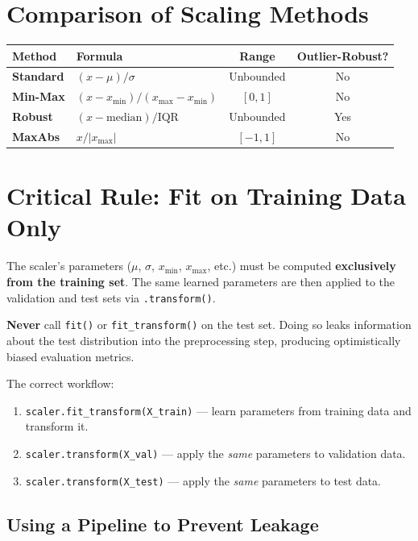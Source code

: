 \section*{Comparison of Scaling Methods}

\begin{center}
\begin{tabularx}{\textwidth}{>{\bfseries}l X c c}
\toprule
Method & Formula & Range & Outlier-Robust? \\
\midrule
Standard & $(x - \mu) / \sigma$ & Unbounded & No \\
Min-Max & $(x - x_{\min}) / (x_{\max} - x_{\min})$ & $[0,1]$ & No \\
Robust & $(x - \text{median}) / \text{IQR}$ & Unbounded & Yes \\
MaxAbs & $x / |x_{\max}|$ & $[-1,1]$ & No \\
\bottomrule
\end{tabularx}
\end{center}

\section*{Critical Rule: Fit on Training Data Only}

\begin{remark}
The scaler's parameters ($\mu$, $\sigma$, $x_{\min}$, $x_{\max}$, etc.) must be computed \textbf{exclusively from the training set}. The same learned parameters are then applied to the validation and test sets via \texttt{.transform()}.

\textbf{Never} call \texttt{fit()} or \texttt{fit\_transform()} on the test set. Doing so leaks information about the test distribution into the preprocessing step, producing optimistically biased evaluation metrics.
\end{remark}

The correct workflow:
\begin{enumerate}
    \item \texttt{scaler.fit\_transform(X\_train)} --- learn parameters from training data and transform it.
    \item \texttt{scaler.transform(X\_val)} --- apply the \textit{same} parameters to validation data.
    \item \texttt{scaler.transform(X\_test)} --- apply the \textit{same} parameters to test data.
\end{enumerate}

\subsection*{Using a Pipeline to Prevent Leakage}

